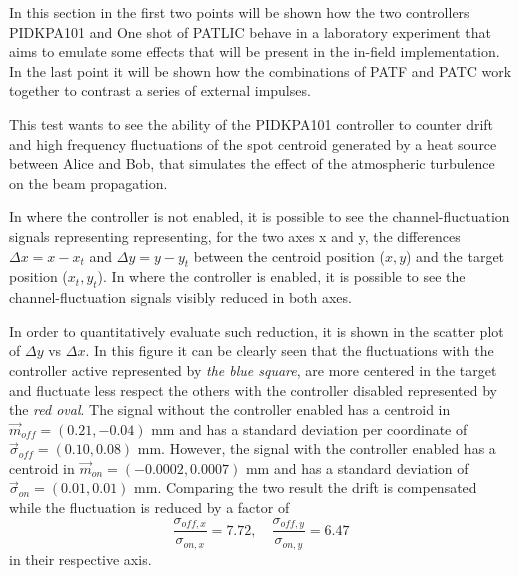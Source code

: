 
In this section in the first two points will be shown how the two controllers PIDKPA101 and One shot of PATLIC behave in a laboratory experiment that aims to emulate some effects that will be present in the in-field implementation.
In the last point it will be shown how the combinations of PATF and PATC work together to contrast a series of external impulses.

This test wants to see the ability of the PIDKPA101 controller to counter drift and high frequency fluctuations of the spot centroid generated by a heat source between Alice and Bob, that simulates the effect of the atmospheric turbulence on
the beam propagation.

In  where the controller is not enabled, it is possible to see the channel-fluctuation signals representing representing, for the two axes x and y, the differences $\Delta x = x - x_t$ and $\Delta y = y - y_t$ between the centroid position ($x,y$) and the target position ($x_t, y_t$).
In  where the controller is enabled, it is possible to see the channel-fluctuation signals visibly reduced in both axes.

In order to quantitatively evaluate such reduction, it is shown in  the scatter plot of $\Delta y$ vs $\Delta x$. In this figure it can be clearly seen that the fluctuations with the controller active represented by \textit{the blue square}, are more centered in the target and fluctuate less respect the others with the controller disabled represented by the \textit{red oval}.
The signal without the controller enabled has a centroid in $\vec{m}_{off} = (0.21, -0.04)$ mm and has a standard deviation per coordinate of $\vec{\sigma}_{off} = (0.10, 0.08)$ mm. However, the signal with the controller enabled has a centroid in $\vec{m}_{on} = (-0.0002,0.0007)$ mm and has a standard deviation of $\vec{\sigma}_{on} = (0.01, 0.01)$ mm. Comparing the two result the drift is compensated while the fluctuation is reduced by a factor of
\begin{equation}
  \frac{\sigma_{off, x}}{\sigma_{on, x}} = 7.72, \quad\frac{\sigma_{off, y}}{\sigma_{on, y}} = 6.47
\end{equation}
in their respective axis.

